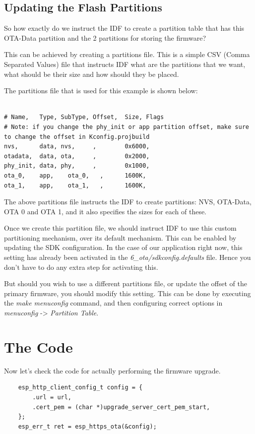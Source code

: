 \documentclass[main.tex]{subfiles}
\begin{document}
\subsection{Updating the Flash Partitions}\label{sec:updating_flash_partitions}
So how exactly do we instruct the IDF to create a partition table that has this OTA-Data partition and the 2 partitions for storing the firmware?

This can be achieved by creating a partitions file. This is a simple CSV (Comma Separated Values) file that instructs IDF what are the partitions that we want, what should be their size and how should they be placed.

The partitions file that is used for this example is shown below:
\begin{verbatim}

# Name,   Type, SubType, Offset,  Size, Flags
# Note: if you change the phy_init or app partition offset, make sure to change the offset in Kconfig.projbuild
nvs,      data, nvs,     ,        0x6000,
otadata,  data, ota,     ,        0x2000,
phy_init, data, phy,     ,        0x1000,
ota_0,    app,    ota_0,   ,      1600K,
ota_1,    app,    ota_1,   ,      1600K,
\end{verbatim}

The above partitions file instructs the IDF to create partitions: NVS, OTA-Data, OTA 0 and OTA 1, and it also specifies the sizes for each of these.

Once we create this partition file, we should instruct IDF to use this custom partitioning mechanism, over its default mechanism. This can be enabled by updating the SDK configuration. In the case of our application right now, this setting has already been activated in the \textit{6\_ota/sdkconfig.defaults} file. Hence you don't have to do any extra step for activating this.

But should you wish to use a different partitions file, or update the offset of the primary firmware, you should modify this setting. This can be done by executing the \textit{make menuconfig} command, and then configuring correct options in \textit{menuconfig} -> \textit{Partition Table}.

\section{The Code}
Now let's check the code for actually performing the firmware upgrade.

\begin{verbatim}
    esp_http_client_config_t config = {
        .url = url,
        .cert_pem = (char *)upgrade_server_cert_pem_start,
    };
    esp_err_t ret = esp_https_ota(&config);
\end{verbatim}
\end{document}
